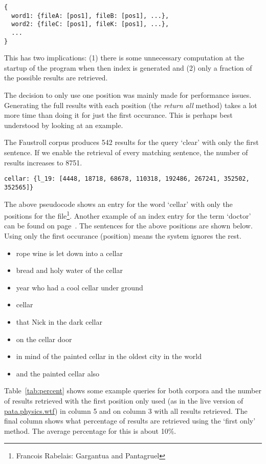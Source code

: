 \begin{verbatim}
{
  word1: {fileA: [pos1], fileB: [pos1], ...},
  word2: {fileC: [pos1], fileK: [pos1], ...},
  ...
}
\end{verbatim}

This has two implications: (1) there is some unnecessary computation at the startup of the program when then index is generated and (2) only a fraction of the possible results are retrieved.

The decision to only use one position was mainly made for performance issues. Generating the full results with each position (the \emph{return all} method) takes a lot more time than doing it for just the first occurance. This is perhaps best understood by looking at an example.

The Faustroll corpus produces \num{542} results for the query `clear' with only the first sentence. If we enable the retrieval of every matching sentence, the number of results increases to \num{8751}.

\begin{verbatim}
cellar: {l_19: [4448, 18718, 68678, 110318, 192486, 267241, 352502, 352565]}
\end{verbatim}

The above pseudocode shows an entry for the word `cellar' with only the positions for the  file\footnote{Francois Rabelais: Gargantua and Pantagruel}. Another example of an index entry for the term `doctor' can be found on page~\pageref{c:pos}. The sentences for the above positions are shown below. Using only the first occurance (position) means the system ignores the rest.

\begin{itemize}
  \item rope wine is let down into a cellar
  \item bread and holy water of the cellar
  \item year who had a cool cellar under ground
  \item cellar
  \item that Nick in the dark cellar
  \item on the cellar door
  \item in mind of the painted cellar in the oldest city in the world
  \item and the painted cellar also
\end{itemize}

Table~\ref{tab:percent} shows some example queries for both corpora and the number of results retrieved with the first position only used (as in the live version of \url{pata.physics.wtf}) in column 5 and on column 3 with all results retrieved. The final column shows what percentage of results are retrieved using the `first only' method. The average percentage for this is about 10\%. 

